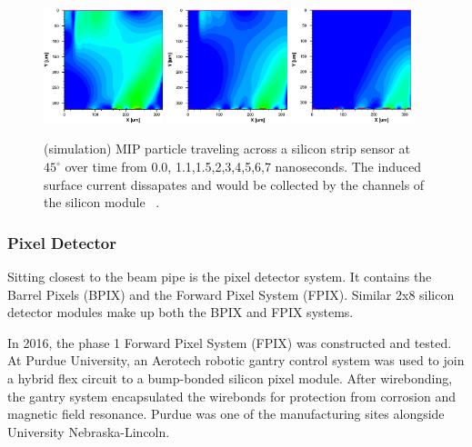 \begin{figure}[ht!b]
  \includegraphics[width=0.31\textwidth]{figures/silicon/silicon_t5.0.png}
  \includegraphics[width=0.31\textwidth]{figures/silicon/silicon_t6.0.png}
  \includegraphics[width=0.31\textwidth]{figures/silicon/silicon_t7.0.png}\\
    \caption{\label{fig:sd} (simulation) MIP particle traveling across a silicon strip sensor at $45^\circ$ over time from 0.0, 1.1,1.5,2,3,4,5,6,7 nanoseconds. The induced surface current dissapates and would be collected by the channels of the silicon module ~\cite{Eichhorn:2112017}.}
\end{figure}





\subsubsection{Pixel Detector}
\label{sec:pixeldet}
Sitting closest to the beam pipe is the pixel detector system. It contains the Barrel Pixels (BPIX) and the Forward Pixel System (FPIX).  
Similar 2x8 silicon detector modules make up both the BPIX and FPIX systems.

In 2016, the phase 1 Forward Pixel System (FPIX) was constructed and tested. At Purdue University, an Aerotech robotic gantry control system was used to join a hybrid flex circuit to a bump-bonded silicon pixel module. After wirebonding, the gantry system encapsulated the wirebonds for protection from corrosion and magnetic field resonance. Purdue was one of the manufacturing sites alongside University Nebraska-Lincoln. 

